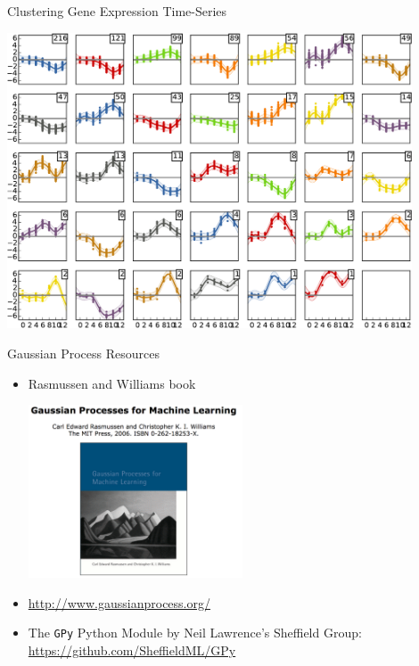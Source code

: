 \documentclass[pdf]{beamer}
\begin{document}
\begin{frame}{Clustering Gene Expression Time-Series}
\begin{center}
	\includegraphics[width=0.9\textwidth]{ProbeClustering.pdf}
\end{center}
\end{frame}

\begin{frame}{Gaussian Process Resources}
\begin{itemize}\addtolength{\itemsep}{0.3\baselineskip}
	\item Rasmussen and Williams book
	\begin{center}
		\includegraphics[width=0.5\textwidth]{GPBook.png}
	\end{center}
	\item \href{http://www.gaussianprocess.org/}{http://www.gaussianprocess.org/}
	\item The \texttt{GPy} Python Module by Neil Lawrence's Sheffield Group:\\ 
	\href{https://github.com/SheffieldML/GPy}{https://github.com/SheffieldML/GPy}
\end{itemize}
\end{frame}

\end{document}
